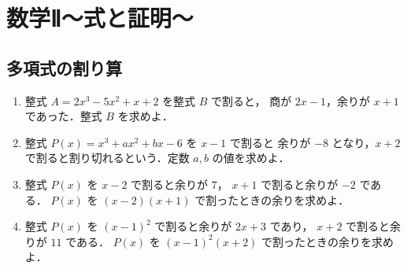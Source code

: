 \documentclass[../../all/math-standard_questions_all.tex]{subfiles}
\begin{document}
\setlength{\abovedisplayskip}{2mm}
\setlength{\belowdisplayskip}{1mm}

\section{数学Ⅱ～式と証明～}

\subsection{多項式の割り算}

\begin{enumerate}
    \item 整式 $A = 2x^3 - 5x^2 + x + 2$ を整式 $B$ で割ると，
        商が $2x - 1$，余りが $x + 1$ であった．整式 $B$ を求めよ．
    
    \item 整式 $P(x) = x^3 + ax^2 + bx - 6$ を $x - 1$ で割ると
        余りが $-8$ となり，$x + 2$ で割ると割り切れるという．定数 $a, b$ の値を求めよ．
    
    \item 整式 $P(x)$ を $x - 2$ で割ると余りが $7$，
        $x + 1$ で割ると余りが $-2$ である．
        $P(x)$ を $(x - 2)(x + 1)$ で割ったときの余りを求めよ．
    
    \item 整式 $P(x)$ を $(x - 1)^2$ で割ると余りが $2x + 3$ であり，
        $x + 2$ で割ると余りが $11$ である．
        $P(x)$ を $(x - 1)^2(x + 2)$ で割ったときの余りを求めよ．
\end{enumerate}
\end{document}

